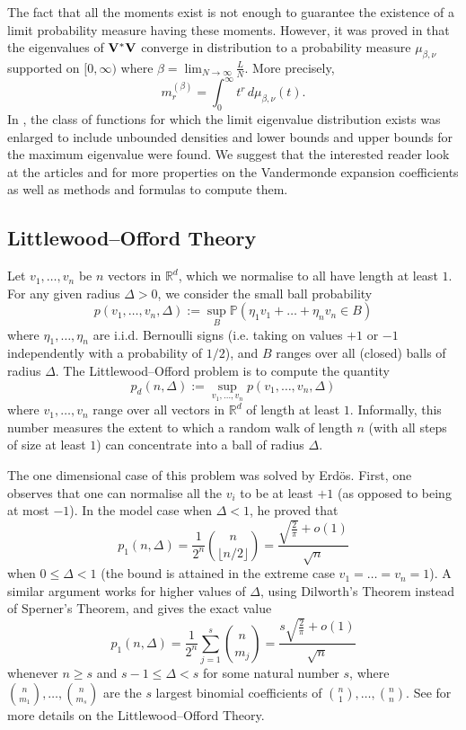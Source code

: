 \documentclass[smallextended]{svjour3}
\begin{document}
The fact that all the moments exist is not enough to guarantee the existence of a limit probability measure having these moments. However, it was proved in \cite{TW} that the eigenvalues of ${\bf V^{*}V}$ converge in distribution to a probability measure $\mu_{\beta,\nu}$ supported on $[0,\infty)$ where $\beta=\lim_{N\to\infty}{\frac{L}{N}}$. More precisely, 
$$
m_{r}^{(\beta)}=\int_{0}^{\infty}{t^{r}\,d\mu_{\beta,\nu}(t)}.
$$ 
In \cite{TW}, the class of functions for which the limit eigenvalue distribution exists was enlarged to include unbounded densities and lower bounds and upper bounds for the maximum eigenvalue were found. We suggest that the interested reader look at the articles \cite{GC02} and \cite{TW} for more properties on the Vandermonde expansion coefficients as well as methods and formulas to compute them. 

\subsection{Littlewood--Offord Theory}

Let $v_1,\ldots,v_n$ be $n$ vectors in $\mathbb{R}^d$, which we normalise to all have length at least $1$. For any given radius $\Delta > 0$, we consider the small ball probability
$$
\displaystyle p(v_1,\ldots,v_n,\Delta) := \sup_B {\mathbb{P}}( \eta_1 v_1 + \ldots + \eta_n v_n \in B )
$$
where $\eta_1,\ldots,\eta_n$ are i.i.d. Bernoulli signs (i.e. taking on values $+1$ or $-1$ independently with a probability of $1/2$), and $B$ ranges over all (closed) balls of radius $\Delta$. The Littlewood--Offord problem is to compute the quantity
$$
\displaystyle p_d(n,\Delta) := \sup_{v_1,\ldots,v_n} p(v_1,\ldots,v_n,\Delta)
$$
where $v_1,\ldots,v_n$ range over all vectors in $\mathbb{R}^d$ of length at least $1$. Informally, this number measures the extent to which a random walk of length $n$ (with all steps of size at least $1$) can concentrate into a ball of radius $\Delta$.

The one dimensional case of this problem was solved by Erd\"os. First, one observes that one can normalise all the $v_i$ to be at least $+1$ (as opposed to being at most $-1$). In the model case when $\Delta < 1$, he proved that
$$
\displaystyle p_1(n,\Delta) = \frac{1}{2^n}\binom{n}{\lfloor n/2\rfloor} = \frac{\sqrt{\frac{2}{\pi}}+o(1)}{\sqrt{n}}
$$
when $0 \leq \Delta < 1$ (the bound is attained in the extreme case $v_1=\ldots=v_n=1$). A similar argument works for higher values of $\Delta$, using Dilworth's Theorem instead of Sperner's Theorem, and gives the exact value
\begin{equation}\label{LOT}
p_1(n,\Delta) = \frac{1}{2^n}\sum_{j=1}^s \binom{n}{m_j} = \frac{s\sqrt{\frac{2}{\pi}}+o(1)}{\sqrt{n}}
\end{equation}
whenever $n \geq s$ and $s-1 \leq \Delta < s$ for some natural number $s$, where $\binom{n}{m_1},\ldots,\binom{n}{m_s}$ are the $s$ largest binomial coefficients of $\binom{n}{1}, \ldots, \binom{n}{n}$. See \cite{taovu} for more details on the Littlewood--Offord Theory.
\end{document}
